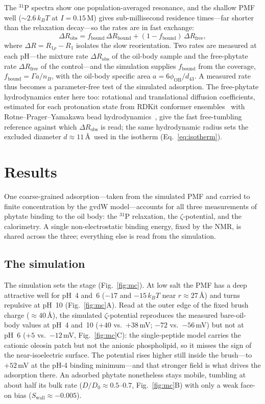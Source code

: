 \documentclass[11pt]{article}
\begin{document}
The $^{31}$P spectra show one population-averaged resonance, and the shallow PMF
well ($\sim\!2.6\,k_BT$ at $I=0.15$\,M) gives sub-millisecond residence
times---far shorter than the relaxation decay---so the rates are in fast exchange:
\begin{equation}\label{eq:twosite}
\Delta R_\text{obs} = f_\text{bound}\,\Delta R_\text{bound}
                    + (1-f_\text{bound})\,\Delta R_\text{free},
\end{equation}
where $\Delta R = R_{1\rho}-R_1$ isolates the slow reorientation.  Two rates are
measured at each pH---the mixture rate $\Delta R_\text{obs}$ of the oil-body sample
and the free-phytate rate $\Delta R_\text{free}$ of the control---and the
simulation supplies $f_\text{bound}$ from the coverage, $f_\text{bound}=\Gamma
a/n_B$, with the oil-body specific area $a=6\phi_\text{OB}/d_{43}$.  A measured
rate thus becomes a parameter-free test of the simulated adsorption.  The
free-phytate hydrodynamics enter here too: rotational and translational diffusion
coefficients, estimated for each protonation state from RDKit conformer
ensembles~\cite{RDKit} with Rotne--Prager--Yamakawa bead
hydrodynamics~\cite{Zuk2018,Waszkiewicz2023}, give the fast free-tumbling reference
against which $\Delta R_\text{obs}$ is read; the same hydrodynamic radius sets the
excluded diameter $d\approx11$\,\AA\ used in the isotherm (Eq.~\ref{eq:isotherm}).

\section{Results}

One coarse-grained adsorption---taken from the simulated PMF and carried to finite
concentration by the gvdW model---accounts for all three
measurements of phytate binding to the oil body: the $^{31}$P relaxation, the
$\zeta$-potential, and the calorimetry.  A single non-electrostatic binding energy,
fixed by the NMR, is shared across the three; everything else is read from the
simulation.

\subsection{The simulation}

The simulation sets the stage (Fig.~\ref{fig:mc}).  At low salt the PMF has a deep
attractive well for pH~4 and~6 ($-17$ and $-15\,k_BT$ near $r\approx27$\,\AA) and
turns repulsive at pH~10 (Fig.~\ref{fig:mc}A).  Read at the outer edge of the fixed
brush charge ($\approx\!40$\,\AA), the simulated $\zeta$-potential reproduces the
measured bare-oil-body values at pH~4 and~10 ($+40$ vs.\ $+38$\,mV; $-72$ vs.\
$-56$\,mV) but not at pH~6 ($+5$ vs.\ $-12$\,mV, Fig.~\ref{fig:mc}C): the
single-peptide model carries the cationic oleosin patch but not the anionic
phospholipid, so it misses the sign of the near-isoelectric surface.  The potential
rises higher still inside the brush---to $+52$\,mV at the pH-4 binding
minimum---and that stronger field is what drives the adsorption there.  An adsorbed
phytate nonetheless stays mobile, tumbling at about half its bulk rate
($D/D_0\approx0.5$--$0.7$, Fig.~\ref{fig:mc}B) with only a weak face-on bias
($S_\text{wall}\approx-0.005$).
\end{document}
